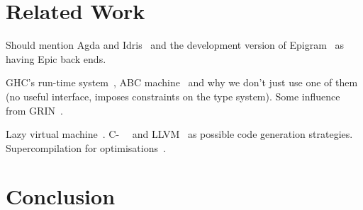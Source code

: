\section{Related Work}

Should mention Agda and Idris~\cite{scrap-engine} and the development
version of Epigram~\cite{levitation} as having Epic back ends.

GHC's run-time system~\cite{stg, evalpush}, ABC
machine~\cite{abc-machine} and why we don't just use one of them
(no useful interface, imposes constraints on the type system).
Some influence from GRIN~\cite{grin-project}.

Lazy virtual machine~\cite{lvm}. C-~~\cite{c--} and LLVM~\cite{llvm}
as possible code generation strategies. Supercompilation for
optimisations~\cite{mitchell-super}.

\section{Conclusion}


